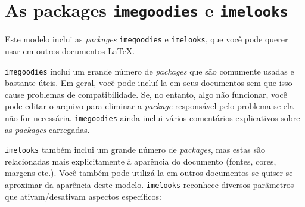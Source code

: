 
\chapter{As packages \texttt{imegoodies} e \texttt{imelooks}}
\label{ann:imegoodlooks}

Este modelo inclui as \textit{packages} \texttt{imegoodies} e \texttt{imelooks},
que você pode querer usar em outros documentos \LaTeX.

\texttt{imegoodies} inclui um grande número de \textit{packages} que são
comumente usadas e bastante úteis. Em geral, você pode incluí-la em seus
documentos sem que isso cause problemas de compatibilidade. Se, no
entanto, algo não funcionar, você pode editar o arquivo para eliminar
a \textit{package} responsável pelo problema se ela não for necessária.
\texttt{imegoodies} ainda inclui vários comentários explicativos sobre as
\textit{packages} carregadas.

\texttt{imelooks} também inclui um grande número de \textit{packages}, mas
estas são relacionadas mais explicitamente à aparência do documento
(fontes, cores, margens etc.). Você também pode utilizá-la em outros
documentos se quiser se aproximar da aparência deste modelo. \texttt{imelooks}
reconhece diversos parâmetros que ativam/desativam aspectos específicos:

